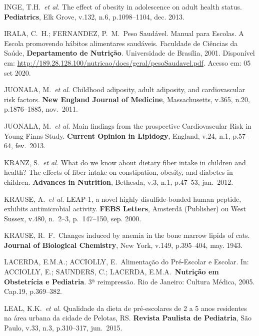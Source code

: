 \bigbreak

\noindent INGE, T.H.\ \textit{et al.} The effect of obesity in adolescence on adult health status. \textbf{Pediatrics}, Elk Grove, v.132, n.6, p.1098--1104, dec. 2013. 

\bigbreak

\noindent IRALA, C.\ H.; FERNANDEZ, P.\ M.\ Peso Saudável. Manual para Escolas. A Escola promovendo hábitos alimentares saudáveis. Faculdade de Ciências da Saúde, \textbf{Departamento de Nutrição}. Universidade de Brasília, 2001. Disponível em: \url{http://189.28.128.100/nutricao/docs/geral/pesoSaudavel.pdf}. Acesso em: 05 set 2020. 

\bigbreak

\noindent JUONALA, M.\ \textit{et al.} Childhood adiposity, adult adiposity, and cardiovascular risk factors. \textbf{New England Journal of Medicine}, Massachusetts, v.365, n.20, p.1876--1885, nov.\ 2011.

\bigbreak

\noindent JUONALA, M.\ \textit{et al.} Main findings from the prospective Cardiovascular Risk in Young Finns Study. \textbf{Current Opinion in Lipidogy}, England, v.24, n.1, p.57--64, fev.\ 2013.

\bigbreak

\noindent KRANZ, S.\ \textit{et al.} What do we know about dietary fiber intake in children and health? The effects of fiber intake on constipation, obesity, and diabetes in children. \textbf{Advances in Nutrition}, Bethesda, v.3, n.1, p.47--53, jan.\ 2012.

\bigbreak

\noindent KRAUSE, A.\ \textit{et al.} LEAP-1, a novel highly disulfide-bonded human peptide, exhibits antimicrobial activity. \textbf{FEBS Letters}, Amsterdã (Publisher) ou West Sussex, v.480, n.\ 2--3, p.\ 147--150, sep. 2000.
\bigbreak

\noindent KRAUSE, R.\ F.\ Changes induced by anemia in the bone marrow lipids of cats. \textbf{Journal of Biological Chemistry}, New York, v.149, p.395--404, may. 1943.

\bigbreak

\noindent LACERDA, E.M.A.; ACCIOLLY, E.\ Alimentação do Pré-Escolar e Escolar. In: ACCIOLLY, E.; SAUNDERS, C.; LACERDA, E.M.A.\ \textbf{Nutrição em Obstetrícia e Pediatria}. 3ª reimpressão. Rio de Janeiro: Cultura Médica, 2005. Cap.19, p.369--382. 

\bigbreak

\noindent LEAL, K.K.\ \textit{et al.} Qualidade da dieta de pré-escolares de 2 a 5 anos residentes na área urbana da cidade de Pelotas, RS. \textbf{Revista Paulista de Pediatria}, São Paulo, v.33, n.3, p.310--317, jun.\ 2015.

